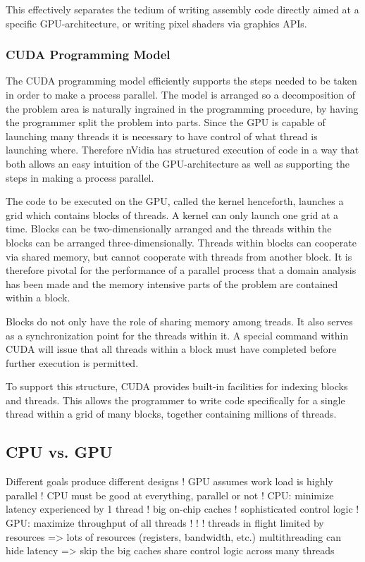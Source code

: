 This effectively separates the tedium of writing assembly code directly aimed at a specific GPU-architecture, or writing pixel shaders via graphics APIs.

\subsubsection{CUDA Programming Model}
The CUDA programming model efficiently supports the steps needed to be taken in order to make a process parallel. The model is arranged so a decomposition of the problem area is naturally ingrained in the programming procedure, by having the programmer split the problem into parts. Since the GPU is capable of launching many threads it is necessary to have control of what thread is launching where. Therefore nVidia has structured execution of code in a way that both allows an easy intuition of the GPU-architecture as well as supporting the steps in making a process parallel.

The code to be executed on the GPU, called the kernel henceforth, launches a grid which contains blocks of threads. A kernel can only launch one grid at a time. Blocks can be two-dimensionally arranged and the threads within the blocks can be arranged three-dimensionally. Threads within blocks can cooperate via shared memory, but cannot cooperate with threads from another block. It is therefore pivotal for the performance of a parallel process that a domain analysis has been made and the memory intensive parts of the problem are contained within a block.

Blocks do not only have the role of sharing memory among treads. It also serves as a synchronization point for the threads within it. A special command within CUDA will issue that all threads within a block must have completed before further execution is permitted.

To support this structure, CUDA provides built-in facilities for indexing blocks and threads. This allows the programmer to write code specifically for a single thread within a grid of many blocks, together containing millions of threads.

\subsection{CPU vs. GPU}
  Different goals produce different designs !   GPU assumes work load is highly parallel !   CPU must be good at everything, parallel or not
!   CPU: minimize latency experienced by 1 thread !   big on-chip caches !   sophisticated control logic
!   GPU: maximize throughput of all threads
!  
!   !  
threads in flight limited by resources => lots of resources (registers, bandwidth, etc.)
multithreading can hide latency => skip the big caches share control logic across many threads